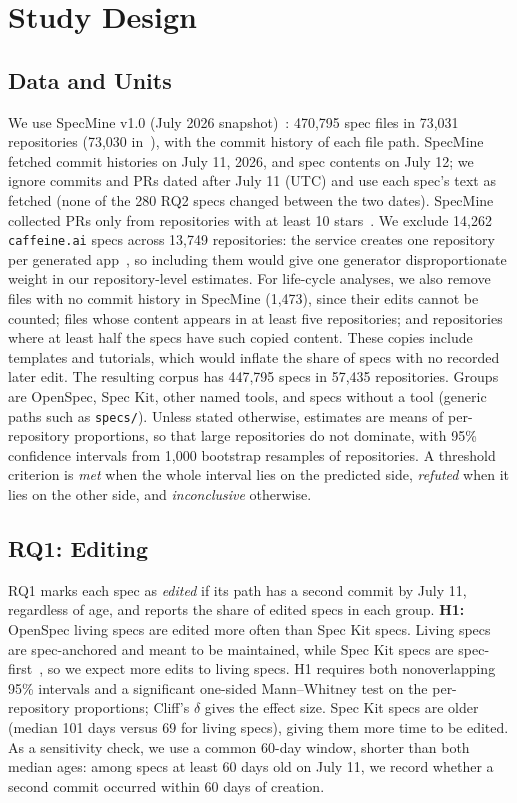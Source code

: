 \documentclass[10pt,conference]{IEEEtran}
\begin{document}
\section{Study Design}
\subsection{Data and Units}
We use SpecMine v1.0 (July 2026 snapshot)~\cite{specmine2026}: 470,795 spec files in 73,031 repositories (73,030 in~\cite{agarwal2026sdd}), with the commit history of each file path. SpecMine fetched commit histories on July 11, 2026, and spec contents on July 12; we ignore commits and PRs dated after July 11 (UTC) and use each spec's text as fetched (none of the 280 RQ2 specs changed between the two dates). SpecMine collected PRs only from repositories with at least 10 stars~\cite{agarwal2026sdd}. We exclude 14,262 \texttt{caffeine.ai} specs across 13,749 repositories: the service creates one repository per generated app~\cite{agarwal2026sdd}, so including them would give one generator disproportionate weight in our repository-level estimates. For life-cycle analyses, we also remove files with no commit history in SpecMine (1,473), since their edits cannot be counted; files whose content appears in at least five repositories; and repositories where at least half the specs have such copied content. These copies include templates and tutorials, which would inflate the share of specs with no recorded later edit. The resulting corpus has 447,795 specs in 57,435 repositories. Groups are OpenSpec, Spec Kit, other named tools, and specs without a tool (generic paths such as \texttt{specs/}). Unless stated otherwise, estimates are means of per-repository proportions, so that large repositories do not dominate, with 95\% confidence intervals from 1,000 bootstrap resamples of repositories. A threshold criterion is \emph{met} when the whole interval lies on the predicted side, \emph{refuted} when it lies on the other side, and \emph{inconclusive} otherwise.

\subsection{RQ1: Editing}
RQ1 marks each spec as \emph{edited} if its path has a second commit by July 11, regardless of age, and reports the share of edited specs in each group. \textbf{H1:} OpenSpec living specs are edited more often than Spec Kit specs. Living specs are spec-anchored and meant to be maintained, while Spec Kit specs are spec-first~\cite{bockeler2025sdd}, so we expect more edits to living specs. H1 requires both nonoverlapping 95\% intervals and a significant one-sided Mann--Whitney test on the per-repository proportions; Cliff's $\delta$ gives the effect size. Spec Kit specs are older (median 101 days versus 69 for living specs), giving them more time to be edited. As a sensitivity check, we use a common 60-day window, shorter than both median ages: among specs at least 60 days old on July 11, we record whether a second commit occurred within 60 days of creation.
\end{document}
